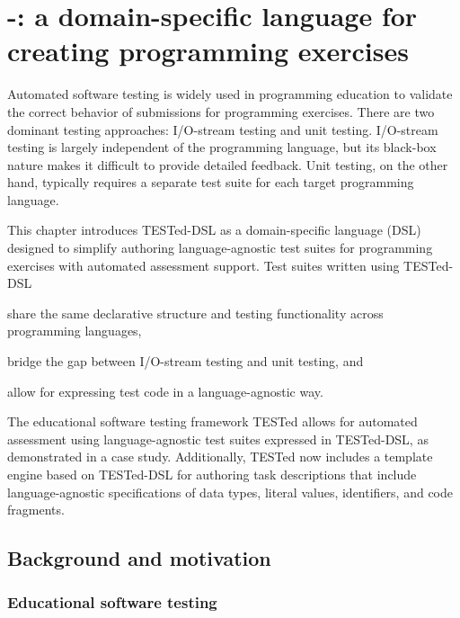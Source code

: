 \documentclass[../main]{subfiles}
\begin{document}
\chapter[\tested{}-\dsl: a \dsl{} for creating programming exercises]{\tested{}-\dsl: a domain-specific language for creating programming exercises}\label{ch:tested-dsl}

Automated software testing is widely used in programming education to validate the correct behavior of submissions for programming exercises.
There are two dominant testing approaches: I/O-stream testing and unit testing.
I/O-stream testing is largely independent of the programming language, but its black-box nature makes it difficult to provide detailed feedback.
Unit testing, on the other hand, typically requires a separate test suite for each target programming language.

This chapter introduces TESTed-DSL as a domain-specific language (DSL) designed to simplify authoring language-agnostic test suites for programming exercises with automated assessment support.
Test suites written using TESTed-DSL
\begin{enumerate*}[label=\emph{\roman*})]
    \item share the same declarative structure and testing functionality across programming languages,
    \item bridge the gap between I/O-stream testing and unit testing, and
    \item allow for expressing test code in a language-agnostic way.
\end{enumerate*}
The educational software testing framework TESTed allows for automated assessment using language-agnostic test suites expressed in TESTed-DSL, as demonstrated in a case study.
Additionally, TESTed now includes a template engine based on TESTed-DSL for authoring task descriptions that include language-agnostic specifications of data types, literal values, identifiers, and code fragments.

\section{Background and motivation}\label{sec:dsl-background-and-motivation}

\subsection{Educational software testing}\label{subsec:dsl-educational-software-testing}
\end{document}
